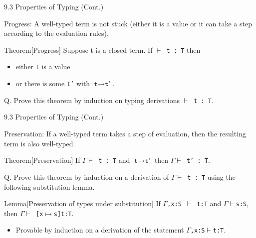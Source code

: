 \documentclass[table]{beamer}
\begin{document}
\begin{frame}[t]{9.3 Properties of Typing (Cont.)} \vspace{10pt}

Progress: A well-typed term is not stuck (either it is a value or it can take a step according to the evaluation rules).

\vspace{10pt}

Theorem[Progress] Suppose t is a closed term. If \texttt{$\vdash$ t : T} then 
\begin{itemize}
\item either \texttt{t} is a value 
\item or there is some \texttt{t'} with $\texttt{t}\rightarrow\texttt{t'}$.
\end{itemize}

\vspace{10pt}

Q. Prove this theorem by induction on typing derivations \texttt{$\vdash$ t : T}.

\end{frame}

\begin{frame}[t]{9.3 Properties of Typing (Cont.)} \vspace{10pt}

Preservation: If a well-typed term takes a step of evaluation, then the resulting term is also well-typed.

\vspace{10pt}

Theorem[Preservation] 
If \texttt{$\Gamma\vdash$ t : T} and $\texttt{t}\rightarrow\texttt{t'}$ then \texttt{$\Gamma\vdash$ t' : T}.

\vspace{10pt}

Q. Prove this theorem by induction on a derivation of \texttt{$\Gamma\vdash$ t : T} using the following substitution lemma.

\vspace{30pt}

Lemma[Preservation of types under substitution] If \texttt{$\Gamma$,x:S $\vdash$ t:T} and \texttt{$\Gamma\vdash$s:S}, then \texttt{$\Gamma\vdash$ [x$\mapsto$s]t:T}.
\begin{itemize}
\item Provable by induction on a derivation of the statement \texttt{$\Gamma$,x:S$\vdash$t:T}. 
\end{itemize}

\end{frame}
\end{document}
